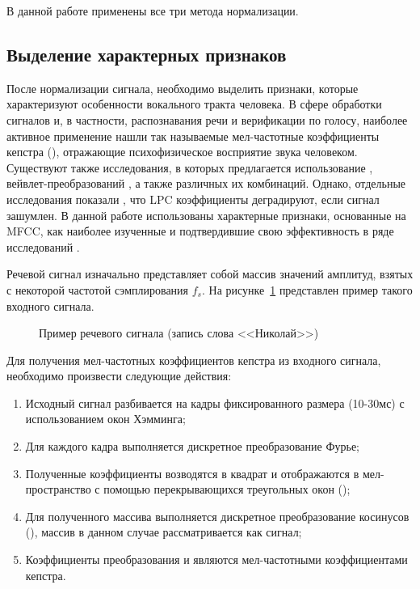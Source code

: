 В данной работе применены все три метода нормализации.

\subsection{Выделение характерных признаков}
\label{sec:analytic:features}

После нормализации сигнала, необходимо выделить признаки, которые характеризуют особенности вокального тракта человека. В сфере обработки сигналов и, в частности, распознавания речи и верификации по голосу, наиболее активное применение нашли так называемые мел-частотные коэффициенты кепстра (), отражающие психофизическое восприятие звука человеком. Существуют также исследования, в которых предлагается использование , вейвлет-преобразований \cite{Medvedev06wavelets}, а также различных их комбинаций. Однако, отдельные исследования показали \cite{Tierney80LPC}, что LPC коэффициенты деградируют, если сигнал зашумлен. В данной работе использованы характерные признаки, основанные на MFCC, как наиболее изученные и подтвердившие свою эффективность в ряде исследований \cite{Jayanna09overview}.

Речевой сигнал изначально представляет собой массив значений амплитуд, взятых с некоторой частотой сэмплирования $f_s$. На рисунке~\ref{fig:waveform} представлен пример такого входного сигнала.

\begin{figure}[h!]
\caption{Пример речевого сигнала (запись слова <<Николай>>)}
\label{fig:waveform}
\end{figure}

Для получения мел-частотных коэффициентов кепстра из входного сигнала, необходимо произвести следующие действия:

\begin{enumerate}
\item Исходный сигнал разбивается на кадры фиксированного размера (10-30мс) с использованием окон Хэмминга;
\item Для каждого кадра выполняется дискретное преобразование Фурье;
\item Полученные коэффициенты возводятся в квадрат и отображаются в мел-пространство с помощью перекрывающихся треугольных окон ();
\item Для полученного массива выполняется дискретное преобразование косинусов (), массив в данном случае рассматривается как сигнал;
\item Коэффициенты преобразования и являются мел-частотными коэффициентами кепстра.
\end{enumerate}

